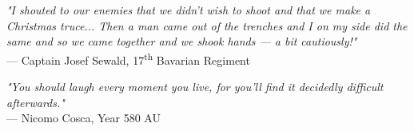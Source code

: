 \begin{flushright}
\emph{"I shouted to our enemies that we didn’t wish to shoot and that we make a Christmas truce... Then a man came out of the trenches and I on my side did the same and so we came together and we shook hands — a bit cautiously!"}\\
— Captain Josef Sewald, 17\textsuperscript{th} Bavarian Regiment
\end{flushright}
\vspace{2em}
\begin{flushright}
\emph{"You should laugh every moment you live, for you'll find it decidedly difficult afterwards."}\\
— Nicomo Cosca, Year 580 AU
\end{flushright}
